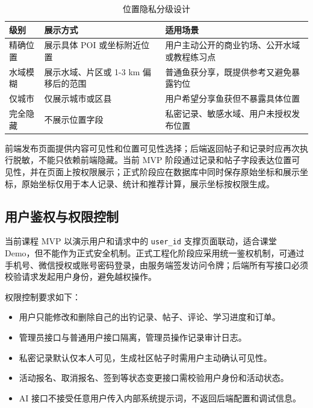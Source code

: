 \begin{table}[H]
  \centering
  \caption{位置隐私分级设计}
  \label{tab:location-privacy}
  \begin{tabularx}{\textwidth}{p{2.5cm}|p{4cm}|X}
    \toprule
    \textbf{级别} & \textbf{展示方式} & \textbf{适用场景} \\
    \midrule
    精确位置 & 展示具体 POI 或坐标附近位置 & 用户主动公开的商业钓场、公开水域或教程练习点 \\
    \hline
    水域模糊 & 展示水域、片区或 1-3 km 偏移后的范围 & 普通鱼获分享，既提供参考又避免暴露钓位 \\
    \hline
    仅城市 & 仅展示城市或区县 & 用户希望分享鱼获但不暴露具体位置 \\
    \hline
    完全隐藏 & 不展示位置字段 & 私密记录、敏感水域、用户未授权发布位置 \\
    \bottomrule
  \end{tabularx}
\end{table}

前端发布页面提供内容可见性和位置可见性选择；后端返回帖子和记录时应再次执行脱敏，不能只依赖前端隐藏。当前 MVP 阶段通过记录和帖子字段表达位置可见性，并在页面上按权限展示；正式阶段应在数据库中同时保存原始坐标和展示坐标，原始坐标仅用于本人记录、统计和推荐计算，展示坐标按权限生成。

\subsection{用户鉴权与权限控制}

当前课程 MVP 以演示用户和请求中的 \texttt{user\_id} 支撑页面联动，适合课堂 Demo，但不能作为正式安全机制。正式工程化阶段应采用统一鉴权机制，可通过手机号、微信授权或账号密码登录，由服务端签发访问令牌；后端所有写接口必须校验请求发起用户身份，避免越权操作。

权限控制要求如下：

\begin{itemize}
  \item 用户只能修改和删除自己的出钓记录、帖子、评论、学习进度和订单。
  \item 管理员接口与普通用户接口隔离，管理员操作记录审计日志。
  \item 私密记录默认仅本人可见，生成社区帖子时需用户主动确认可见性。
  \item 活动报名、取消报名、签到等状态变更接口需校验用户身份和活动状态。
  \item AI 接口不接受任意用户传入内部系统提示词，不返回后端配置和调试信息。
\end{itemize}

